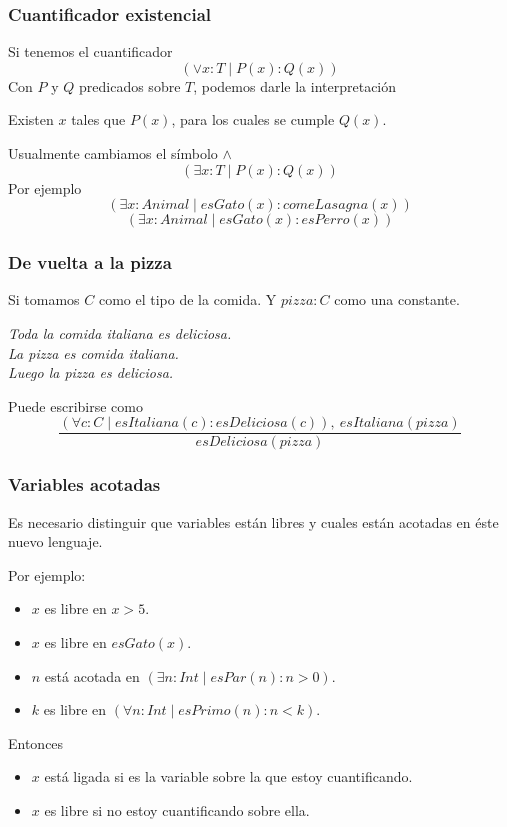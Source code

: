\documentclass{beamer}
\begin{document}
\begin{frame}[fragile]
    \frametitle{Cuantificador existencial}
        \pause
        Si tenemos el cuantificador 
        $$(\lor x:T \mid P(x) : Q(x))$$
        \pause
        Con $P$ y $Q$ predicados sobre $T$, podemos darle la interpretación
        \pause
        \begin{center}
            Existen $x$ tales que $P(x)$, para los cuales se cumple $Q(x)$.
        \end{center}
        \pause
        Usualmente cambiamos el símbolo $\land$
        $$(\exists x:T \mid P(x) : Q(x))$$
        \pause
        Por ejemplo
        \pause
        $$(\exists x:Animal \mid esGato(x) : comeLasagna(x))$$
        \pause
        $$(\exists x:Animal \mid esGato(x) : esPerro(x))$$
\end{frame}

\begin{frame}[fragile]
    \frametitle{De vuelta a la pizza}
    \pause
    Si tomamos $C$ como el tipo de la comida. Y $pizza:C$ como una constante.
    \pause
    \begin{center}
        \textit{Toda la comida italiana es deliciosa.\\ 
        La pizza es comida italiana.\\
        Luego la pizza es deliciosa.}
    \end{center}
    \pause
    Puede escribirse como
    $$\frac{(\forall c: C \mid esItaliana(c): esDeliciosa(c)),\ esItaliana(pizza)}{esDeliciosa(pizza)}$$
\end{frame}

\begin{frame}[fragile]
    \frametitle{Variables acotadas}
    \pause
    Es necesario distinguir que variables están libres y cuales están acotadas en éste nuevo lenguaje.
    \pause

    Por ejemplo:
    \begin{itemize}
        \pause
        \item $x$ es libre en $x > 5$.
        \pause
        \item $x$ es libre en $esGato(x)$.
        \pause
        \item $n$ está acotada en $(\exists n: Int \mid esPar(n) : n > 0)$.
        \pause
        \item $k$ es libre en $(\forall n: Int \mid esPrimo(n) : n < k)$.
    \end{itemize}

    \pause
    Entonces
    \begin{itemize}
        \pause
        \item $x$ está ligada si es la variable sobre la que estoy cuantificando.
        \pause
        \item $x$ es libre si no estoy cuantificando sobre ella.
    \end{itemize}
\end{frame}
\end{document}
